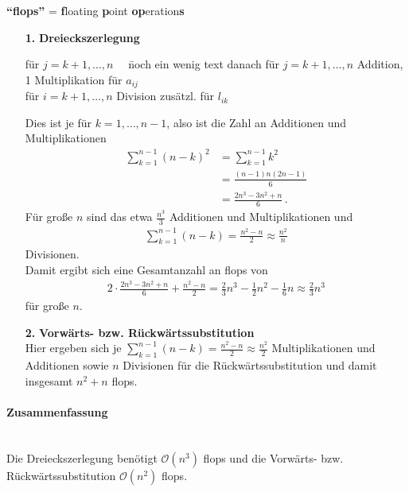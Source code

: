 \textbf{\enquote{flops} }= \textbf{f}loating \textbf{p}oint \textbf{op}eration\textbf{s} \\
\begin{enumerate}
\item[\textbf{1.}] \textbf{Dreieckszerlegung} 
  \begin{tabbing}
    für $j=k+1, \dots, n\quad$ \= noch ein wenig text danach \kill
    für $j=k+1, \dots, n$  Addition, 1 Multiplikation für $a_{ij}$ \\
    für $i=k+1, \dots, n$  Division zusätzl. für $ l_{ik}$
  \end{tabbing}
  Dies ist je für $k=1, \dots, n-1$, also ist die Zahl an Additionen und Multiplikationen
  \begin{align*}
    \sum_{k=1}^{n-1}(n-k)^2 &= \sum_{k=1}^{n-1}k^2 \\
                            &= \frac{(n-1)n(2n-1)}{6} \\
                            &= \frac{2n^3-3n^2+n}{6}\, .
  \end{align*}
  Für große $n$ sind das etwa $\frac{n^3}{3}$ Additionen und Multiplikationen und
  \begin{gather*}
    \sum_{k=1}^{n-1} (n-k) = \frac{n^2-n}{2} \approx \frac{n^2}{n}
  \end{gather*}
  Divisionen. \\
  Damit ergibt sich eine Gesamtanzahl an flops von
  \begin{gather*}
    2\cdot\frac{2n^3-3n^2+n}{6} + \frac{n^2-n}{2} 
    = \frac{2}{3} n^3 - \frac{1}{2}n^2 - \frac{1}{6} n
    \approx \frac{2}{3}n^3
  \end{gather*}
  für große $n$.
  
\item[\textbf{2.}] \textbf{Vorwärts- bzw. Rückwärtssubstitution}  \\
  Hier ergeben sich je
    $\sum_{k=1}^{n-1} (n-k) = \frac{n^2-n}{2} \approx \frac{n^2}{2}$
  Multiplikationen und Additionen sowie 
  $n$ Divisionen für die Rückwärtssubstitution und damit insgesamt $n^2+n$ flops.	
\end{enumerate}
\paragraph{Zusammenfassung}~ \\
Die Dreieckszerlegung benötigt $\mathcal{O}(n^3)$ flops und 
die Vorwärts- bzw. Rückwärtssubstitution $\mathcal{O}(n^2)$ flops.



